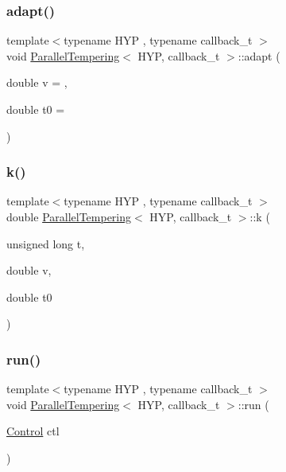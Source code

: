 \mbox{\label{class_parallel_tempering_a673feff316b65cad63f56ceb81b128ae}} 
\subsubsection{\texorpdfstring{adapt()}{adapt()}}
{\footnotesize\ttfamily template$<$typename H\+YP , typename callback\+\_\+t $>$ \\
void \hyperlink{class_parallel_tempering}{Parallel\+Tempering}$<$ H\+YP, callback\+\_\+t $>$\+::adapt (\begin{DoxyParamCaption}\item[{double}]{v = {},  }\item[{double}]{t0 = {} }\end{DoxyParamCaption})\hspace{0.3cm}{\ttfamily [inline]}}

\mbox{\label{class_parallel_tempering_a439c50d3f616319803d4ab83804d1ae0}} 
\subsubsection{\texorpdfstring{k()}{k()}}
{\footnotesize\ttfamily template$<$typename H\+YP , typename callback\+\_\+t $>$ \\
double \hyperlink{class_parallel_tempering}{Parallel\+Tempering}$<$ H\+YP, callback\+\_\+t $>$\+::k (\begin{DoxyParamCaption}\item[{unsigned long}]{t,  }\item[{double}]{v,  }\item[{double}]{t0 }\end{DoxyParamCaption})\hspace{0.3cm}{\ttfamily [inline]}}

\mbox{\label{class_parallel_tempering_a5332ab465d8ec7a1d882e393a416a1f0}} 
\subsubsection{\texorpdfstring{run()}{run()}\hspace{0.1cm}{\footnotesize\ttfamily [1/2]}}
{\footnotesize\ttfamily template$<$typename H\+YP , typename callback\+\_\+t $>$ \\
void \hyperlink{class_parallel_tempering}{Parallel\+Tempering}$<$ H\+YP, callback\+\_\+t $>$\+::run (\begin{DoxyParamCaption}\item[{\hyperlink{struct_control}{Control}}]{ctl }\end{DoxyParamCaption})\hspace{0.3cm}{\ttfamily [inline]}}

